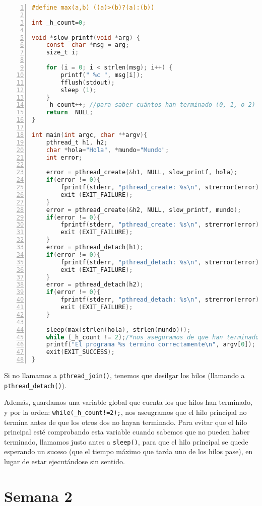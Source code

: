 \documentclass{article}
\begin{document}
\begin{lstlisting}[language=C, texcl=true, numbers=left]
#define max(a,b) ((a)>(b)?(a):(b))

int _h_count=0;

void *slow_printf(void *arg) {
    const  char *msg = arg;
    size_t i;
    
    for (i = 0; i < strlen(msg); i++) {
        printf(" %c ", msg[i]);
        fflush(stdout);
        sleep (1);
    }    
    _h_count++; //para saber cuántos han terminado (0, 1, o 2)
    return  NULL;
}

int main(int argc, char **argv){
    pthread_t h1, h2;
    char *hola="Hola", *mundo="Mundo";
    int error;

    error = pthread_create(&h1, NULL, slow_printf, hola);
    if(error != 0){
        fprintf(stderr, "pthread_create: %s\n", strerror(error));
        exit (EXIT_FAILURE);
    }
    error = pthread_create(&h2, NULL, slow_printf, mundo);
    if(error != 0){
        fprintf(stderr, "pthread_create: %s\n", strerror(error));
        exit (EXIT_FAILURE);
    }
    error = pthread_detach(h1);
    if(error != 0){
        fprintf(stderr, "pthread_detach: %s\n", strerror(error));
        exit (EXIT_FAILURE);
    }
    error = pthread_detach(h2);
    if(error != 0){
        fprintf(stderr, "pthread_detach: %s\n", strerror(error));
        exit (EXIT_FAILURE);
    }

    sleep(max(strlen(hola), strlen(mundo))); 
    while (_h_count != 2);/*nos aseguramos de que han terminado*/
    printf("El programa %s termino correctamente\n", argv[0]);
    exit(EXIT_SUCCESS);
}
\end{lstlisting}

Si no llamamos a \texttt{pthread\_join()}, tenemos que desilgar los hilos (llamando a \texttt{pthread\_detach()}).

Además, guardamos una variable global que cuenta los que hilos han terminado, y por la orden: \texttt{while(\_h\_count!=2);}, nos aseugramos que el hilo principal no termina antes de que los otros dos no hayan terminado. Para evitar que el hilo principal esté comprobando esta variable cuando sabemos que no pueden haber terminado, llamamos justo antes a \texttt{sleep()}, para que el hilo principal se quede esperando un suceso (que el tiempo máximo que tarda uno de los hilos pase), en lugar de estar ejecutándose sin sentido.

\section*{Semana 2}
\end{document}
